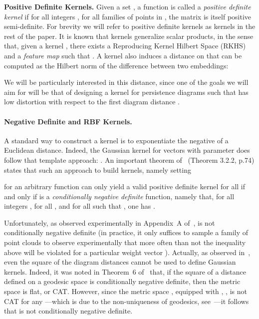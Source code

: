 \documentclass[11pt]{article}
\begin{document}
\textbf{Positive Definite Kernels.} Given a set , a function  
is called a {\em positive definite kernel} if for all integers , for all families  of points in , 
the matrix  is itself positive semi-definite. For brevity we will refer to positive definite 
kernels as kernels in the rest of the paper.
It is known that kernels generalize scalar products, in the sense that, given a kernel , there exists a Reproducing Kernel Hilbert Space
(RKHS)  and a {\em feature map}  such that .
A kernel  also induces a distance  on  that can be computed as the Hilbert norm of the difference between two embeddings:
 
We will be particularly interested in this distance, since one of the goals we will aim for will be that of designing a kernel 
 for persistence diagrams such that  has low distortion with respect to the first diagram distance .

\paragraph*{Negative Definite and RBF Kernels.} A standard way to construct a kernel is to exponentiate the negative of a 
Euclidean distance. Indeed, the Gaussian kernel for vectors with parameter  does follow that template approach: 
. An important theorem of~\cite{Berg84} (Theorem 3.2.2, p.74) states that 
such an approach to build kernels, namely setting 

for an arbitrary function  can only yield a valid positive definite kernel for all  
if and only if  is a \emph{conditionally negative definite} function, namely that, for all integers , 
 for all , and for all  such that , 
one has .


Unfortunately, as observed experimentally in Appendix~A of~\cite{Reininghaus14},   is not conditionally negative definite (in practice, it only suffices to sample a family of point 
clouds to observe experimentally that more often than not the inequality above will be violated for a particular weight vector ).
Actually, as observed in~\cite{Padellini17}, even the square of the diagram distances  cannot be used to define Gaussian kernels.
Indeed, it was noted in Theorem~6 of~\cite{Feragen15} that, if the square of a distance  defined on a geodesic space  is conditionally negative definite,
then the metric space  is flat, or CAT. However, since the metric space , equipped with , , is not CAT for any
---which is due to the non-uniqueness of geodesics, see~\cite{Turner14}---it follows that  is not conditionally negative definite.
 
\end{document}
